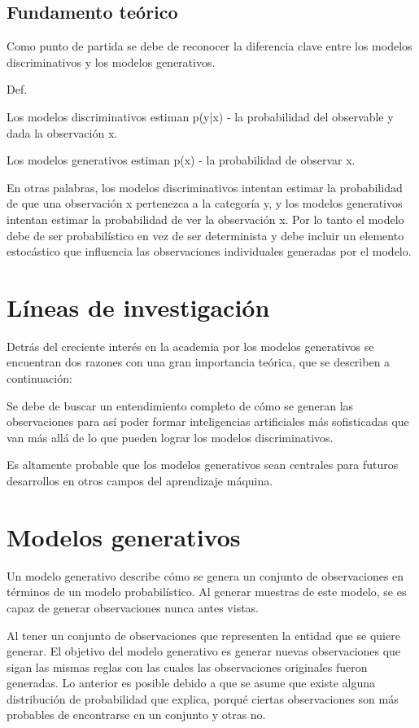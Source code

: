 \subsection{Fundamento teórico}

Como punto de partida se debe de reconocer la diferencia clave entre los modelos discriminativos y los modelos generativos. 

Def.

Los modelos discriminativos estiman p(y|x) - la probabilidad del observable y dada la observación x.

Los modelos generativos estiman p(x) - la probabilidad de observar x.

En otras palabras, los modelos discriminativos intentan estimar la probabilidad de que una observación x pertenezca a la categoría y, y los modelos generativos intentan estimar la probabilidad de ver la observación x. Por lo tanto el modelo debe de ser probabilístico en vez de ser determinista y debe incluir un elemento estocástico que influencia las observaciones individuales generadas por el modelo.

\section{Líneas de investigación}

Detrás del creciente interés en la academia por los modelos generativos se encuentran dos razones con una gran importancia teórica, que se describen a continuación:

Se debe de buscar un entendimiento completo de cómo se generan las observaciones para así poder formar inteligencias artificiales más sofisticadas que van más allá de lo que pueden lograr los modelos discriminativos. 

Es altamente probable que los modelos generativos sean centrales para futuros desarrollos  en otros campos del aprendizaje máquina.

\section{Modelos generativos}

Un modelo generativo describe cómo se genera un conjunto de observaciones en términos de un modelo probabilístico. Al generar muestras de este modelo, se es capaz de generar observaciones nunca antes vistas. 

Al tener un conjunto de observaciones que representen la entidad que se quiere generar. El objetivo del modelo generativo es generar nuevas observaciones que sigan las mismas reglas con las cuales las observaciones originales fueron generadas. Lo anterior es posible debido a que se asume que existe alguna distribución de probabilidad que explica, porqué ciertas observaciones son más probables de encontrarse en un conjunto y otras no. 

